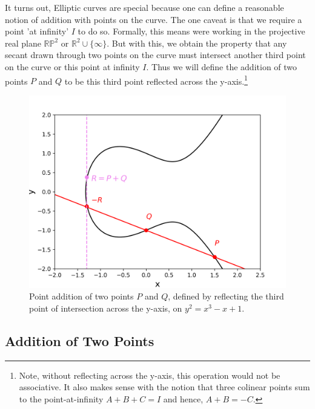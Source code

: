 \documentclass[11pt, a4paper]{report}
\begin{document}
It turns out, Elliptic curves are special because one can define a reasonable notion of addition with points on the curve. The one caveat is that we require a point 'at infinity' $I$ to do so. Formally, this means were working in the projective real plane $\mathbb{RP}^2$ or $\mathbb{R}^2 \cup \lbrace \infty \rbrace$. 
But with this, we obtain the property that any secant drawn through two points on the curve must intersect another third point on the curve or this point at infinity $I$. Thus we will define the addition of two points $P$ and $Q$ to be this third point reflected across the y-axis.\footnote{Note, without reflecting across the y-axis, this operation would not be associative. It also makes sense with the notion that three colinear points sum to the point-at-infinity $A+B+C=I$ and hence, $A+B=-C$.}

\begin{figure}[ht]
\begin{center}
\includegraphics[width=\linewidth]{grouplaw.png} 
\caption{Point addition of two points $P$ and $Q$, defined by reflecting the third point of intersection across the y-axis, on $y^2 = x^3 -x+1$.}
\label{fig:additionEC}
\end{center}
\end{figure}

\subsection{Addition of Two Points}
\end{document}
